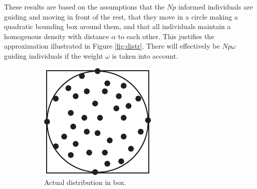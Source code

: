 These results are based on the assumptions that the $Np$ informed individuals are guiding and moving in front of the rest, that they move in a circle making a quadratic bounding box around them, and that all individuals maintain a homogenous density with distance $\alpha$ to each other. This justifies the approximation illustrated in Figure \ref{fig:distr}. There will effectively be $Np\omega$ guiding individuals if the weight $\omega$ is taken into account.
\newcommand{\figwidth}{0.21\textwidth}
\begin{figure}[H]
	\centering
	\begin{subfigure}[b]{\figwidth}
		\includegraphics[width=\textwidth]{img/Circle.pdf}
		\caption{Actual distribution in box.}
		\label{fig:distr_true}
	\end{subfigure}
	~
	\begin{subfigure}[b]{\figwidth}

\end{subfigure}
\end{figure}
